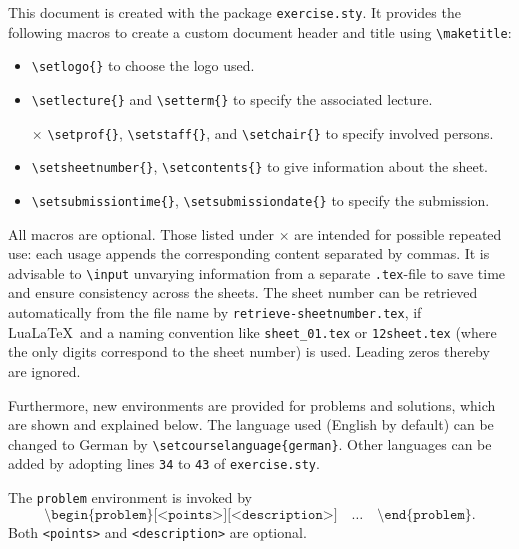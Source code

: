 \documentclass[a4paper]{layout}
\begin{document}
\maketitle

This document is created with the package \texttt{exercise.sty}.
It provides the following macros to create a custom document header and title
using \texttt{\textbackslash maketitle}:
\begin{itemize}
  \item
    \texttt{\textbackslash setlogo\{\}}
    to choose the logo used.
  \item
    \texttt{\textbackslash setlecture\{\}}
    and \texttt{\textbackslash setterm\{\}}
    to specify the associated lecture.
  \item[$\times$]
    \texttt{\textbackslash setprof\{\}},
    \texttt{\textbackslash setstaff\{\}},
    and \texttt{\textbackslash setchair\{\}}
    to specify involved persons.
  \item
    \texttt{\textbackslash setsheetnumber\{\}},
    \texttt{\textbackslash setcontents\{\}}
    to give information about the sheet.
  \item
  \texttt{\textbackslash setsubmissiontime\{\}},
  \texttt{\textbackslash setsubmissiondate\{\}}
  to specify the submission.
\end{itemize}
All macros are optional.
Those listed under $\times$ are intended for possible repeated use:
each usage appends the corresponding content separated by commas.
It is advisable to \texttt{\textbackslash input}
unvarying information from a separate \texttt{.tex}-file
to save time and ensure consistency across the sheets.
The sheet number can be retrieved automatically
from the file name by \texttt{retrieve-sheetnumber.tex},
if Lua\LaTeX\ and a naming convention like
\texttt{sheet\_01.tex} or \texttt{12sheet.tex}
(where the only digits correspond to the sheet number) is used.
Leading zeros thereby are ignored.

Furthermore, new environments are provided for problems and solutions,
which are shown and explained below.
The language used (English by default) can be changed to German by
\texttt{\textbackslash setcourselanguage\{german\}}.
Other languages can be added by adopting lines \texttt{34} to \texttt{43}
of \texttt{exercise.sty}.

\begin{problem}
  The \texttt{problem} environment is invoked by
  \[
    \texttt{\textbackslash begin\{problem\}[<points>][<description>]}
    \quad \unicodeellipsis \quad
    \texttt{\textbackslash end\{problem\}}.
  \]
  Both \texttt{<points>} and \texttt{<description>} are optional.
\end{problem}
\end{document}

